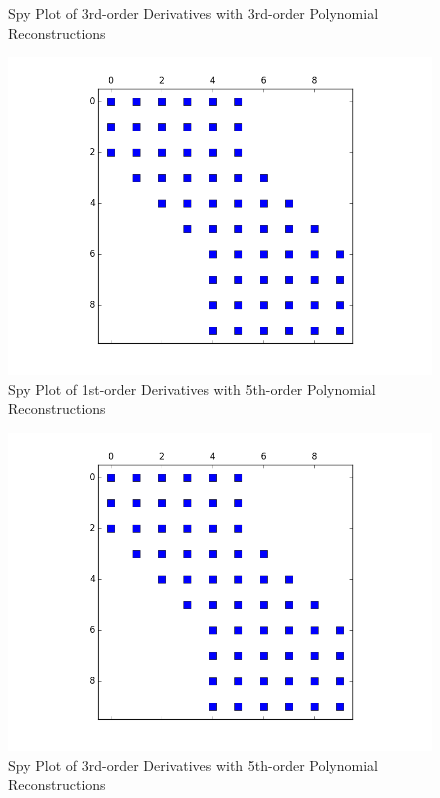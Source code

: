 \documentclass[12pt]{article}
\newenvironment{problem}[2][Problem]{\begin{trivlist}
\item[\hskip \labelsep {\bfseries #1}\hskip \labelsep {\bfseries #2.}]}{\end{trivlist}}
\begin{document}
\begin{problem}{2}
\begin{figure}
 \caption{Spy Plot of 3rd-order Derivatives with 3rd-order Polynomial Reconstructions }
\label{label}
\end{figure}
\begin{figure}
\centering
  \includegraphics[scale=0.5]{p2_5p1d}
 \caption{Spy Plot of 1st-order Derivatives with 5th-order Polynomial Reconstructions }
\label{label}
\end{figure}
\begin{figure}
\centering
  \includegraphics[scale=0.5]{p2_5p3d}
 \caption{Spy Plot of 3rd-order Derivatives with 5th-order Polynomial Reconstructions }
\label{label}
\end{figure}\\
\\

\end{problem}
\end{document}
